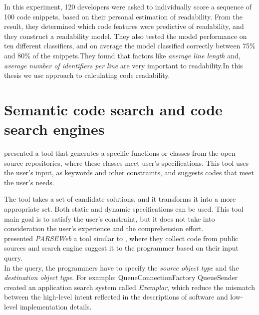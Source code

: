 \documentclass[12pt,mscthesis]{usiinfthesis}
\begin{document}
	In this experiment, 120 developers were asked to individually score a sequence of 100 code snippets, based on their personal estimation of readability. From the result, they determined which code features were predictive of readability, and they construct a readability model. They also tested the model performance on ten different classifiers, and on average the model classified correctly between 75\% and 80\% of the snippets.They found that factors like \textit{average line length} and, \textit{average number of identifiers per line} are very important to readability.In this thesis we use \citet{Buse2010} approach to calculating code readability.

	\section{Semantic code search and code search engines }

	\citet{Reiss:2009:SCS:1555001.1555040} presented a tool that generates a specific functions or classes from the open source repositories, where these classes meet user's specifications. This tool uses the user's input, as keywords and other constraints, and suggests codes that meet the user's needs.


	The tool takes a set of candidate solutions, and it transforms it into a more appropriate set. Both static and dynamic specifications can be used. This tool main goal is to satisfy the user's constraint, but it does not take into consideration the user's experience and the comprehension effort.\\
	

	\citet{Thummalapenta:2007:PPA:1321631.1321663} presented \emph{PARSEWeb} a tool similar to \citet{Reiss:2009:SCS:1555001.1555040}, where they collect code from public sources and search engine suggest it to the programmer based on their input query.\\ In the query, the programmers have to specify the \textit{source object type} and the \textit{destination object type}. For example: QueueConnectionFactory \rightarrow QueueSender\\
	

	\citet{McMillan:2011:FRF:1985793.1986032} created an application search system called \textit{Exemplar}, which reduce the mismatch between the high-level intent reflected in the descriptions of software and low-level implementation details.
\end{document}
